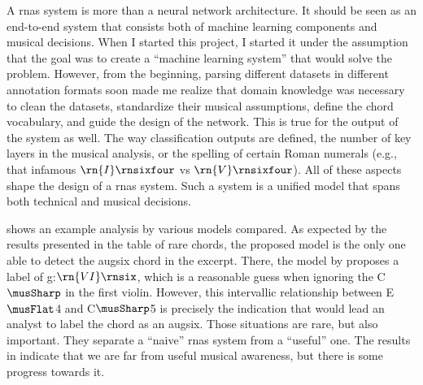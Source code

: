 
A \glspl{rna} system is more than a neural network
architecture. It should be seen as an end-to-end system that
consists both of machine learning components and musical
decisions. When I started this project, I started it under
the assumption that the goal was to create a ``machine
learning system'' that would solve the problem. However,
from the beginning, parsing different datasets in different
annotation formats soon made me realize that domain
knowledge was necessary to clean the datasets, standardize
their musical assumptions, define the chord vocabulary, and
guide the design of the network. This is true for the output
of the system as well. The way classification outputs are
defined, the number of key layers in the musical analysis,
or the spelling of certain Roman numerals (e.g., that
infamous $\rn{I}\rnsixfour$ vs $\rn{V}\rnsixfour$). All of
these aspects shape the design of a \glspl{rna} system. Such
a system is a unified model that spans both technical and
musical decisions.

 shows an example analysis by
various models compared. As expected by the results
presented in the table of rare chords, the proposed model is
the only one able to detect the \gls{augsix} chord in the
excerpt. There, the model by \textcite{mcleod2021modular}
proposes a label of g:$\rn{VI}\rnsix$, which is a reasonable
guess when ignoring the C$\musSharp$ in the first violin.
However, this intervallic relationship between E$\musFlat$4
and C$\musSharp$5 is precisely the indication that would
lead an analyst to label the chord as an \gls{augsix}.
Those situations are rare, but also important. They separate
a ``naive'' \glspl{rna} system from a ``useful'' one. The
results in  indicate that we are far
from useful musical awareness, but there is some progress
towards it.

